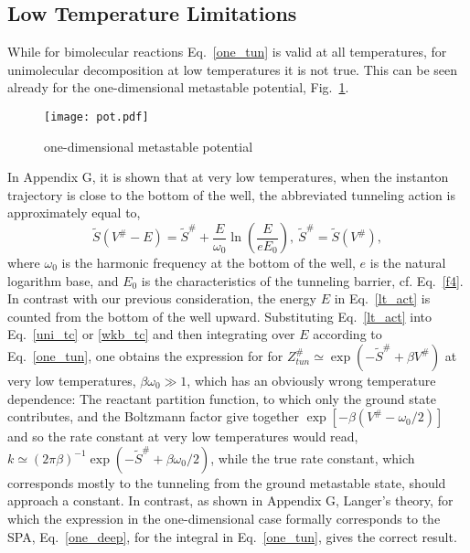 \documentclass[journal=jpcafh,manuscript=article]{achemso}
\begin{document}
\subsection{Low Temperature Limitations}

While for bimolecular reactions Eq.~\ref{one_tun} is valid at all
temperatures, for unimolecular decomposition at low temperatures it is
not true. This can be seen already for the one-dimensional metastable
potential, Fig.~\ref{fig_pot}.
\begin{figure}[p]
  \begin{center}
    \texttt{[image: pot.pdf]}
%
\caption{one-dimensional metastable potential}
\label{fig_pot}
\end{center}
\end{figure}
In Appendix G, it is shown that at very low temperatures, when the
instanton trajectory is close to the bottom of the well, the
abbreviated tunneling action is approximately equal to,
\begin{equation}
  \label{lt_act}
\tilde{S}(V^\#-E)=\tilde{S}^\#+\frac{E}{\omega_0}\ln\left(\frac{E}{eE_0}\right),\ 
  \tilde{S}^\#=\tilde{S}(V^\#) ,
\end{equation}
where $\omega_0$ is the harmonic frequency at the bottom of the well,
$e$ is the natural logarithm base, and $E_0$ is the characteristics of
the tunneling barrier, cf. Eq.~\ref{f4}. In contrast with our previous
consideration, the energy $E$ in Eq.~\ref{lt_act} is counted from the
bottom of the well upward. Substituting Eq.~\ref{lt_act} into
Eq.~\ref{uni_tc} or \ref{wkb_tc} and then integrating over $E$
according to Eq.~\ref{one_tun}, one obtains the expression for for
$Z^\#_{tun}\simeq \exp(-\tilde{S}^\#+\beta V^\#)$ at very low
temperatures, $\beta\omega_0\gg1$, which has an obviously wrong
temperature dependence: The reactant partition function, to which only
the ground state contributes, and the Boltzmann factor give together
$\exp[-\beta (V^\#-\omega_0/2)]$ and so the rate constant at very low
temperatures would read,
$k\simeq(2\pi\beta)^{-1}\exp(-\tilde{S}^\#+\beta\omega_0/2)$, while
the true rate constant, which corresponds mostly to the tunneling from
the ground metastable state, should approach a constant. In contrast,
as shown in Appendix G, Langer's theory, for which the expression in
the one-dimensional case formally corresponds to the SPA,
Eq.~\ref{one_deep}, for the integral in Eq.~\ref{one_tun}, gives the
correct result.
\end{document}
